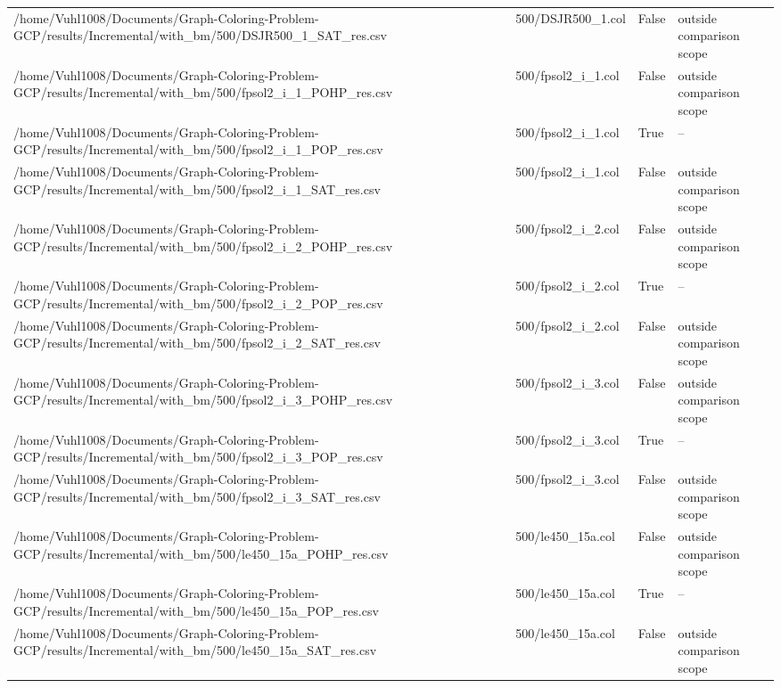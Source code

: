 \begin{table}[htbp]
\begin{tabular}{llll}
/home/Vuhl1008/Documents/Graph-Coloring-Problem-GCP/results/Incremental/with\_bm/500/DSJR500\_1\_SAT\_res.csv & 500/DSJR500\_1.col & False & outside comparison scope \\
/home/Vuhl1008/Documents/Graph-Coloring-Problem-GCP/results/Incremental/with\_bm/500/fpsol2\_i\_1\_POHP\_res.csv & 500/fpsol2\_i\_1.col & False & outside comparison scope \\
/home/Vuhl1008/Documents/Graph-Coloring-Problem-GCP/results/Incremental/with\_bm/500/fpsol2\_i\_1\_POP\_res.csv & 500/fpsol2\_i\_1.col & True & -- \\
/home/Vuhl1008/Documents/Graph-Coloring-Problem-GCP/results/Incremental/with\_bm/500/fpsol2\_i\_1\_SAT\_res.csv & 500/fpsol2\_i\_1.col & False & outside comparison scope \\
/home/Vuhl1008/Documents/Graph-Coloring-Problem-GCP/results/Incremental/with\_bm/500/fpsol2\_i\_2\_POHP\_res.csv & 500/fpsol2\_i\_2.col & False & outside comparison scope \\
/home/Vuhl1008/Documents/Graph-Coloring-Problem-GCP/results/Incremental/with\_bm/500/fpsol2\_i\_2\_POP\_res.csv & 500/fpsol2\_i\_2.col & True & -- \\
/home/Vuhl1008/Documents/Graph-Coloring-Problem-GCP/results/Incremental/with\_bm/500/fpsol2\_i\_2\_SAT\_res.csv & 500/fpsol2\_i\_2.col & False & outside comparison scope \\
/home/Vuhl1008/Documents/Graph-Coloring-Problem-GCP/results/Incremental/with\_bm/500/fpsol2\_i\_3\_POHP\_res.csv & 500/fpsol2\_i\_3.col & False & outside comparison scope \\
/home/Vuhl1008/Documents/Graph-Coloring-Problem-GCP/results/Incremental/with\_bm/500/fpsol2\_i\_3\_POP\_res.csv & 500/fpsol2\_i\_3.col & True & -- \\
/home/Vuhl1008/Documents/Graph-Coloring-Problem-GCP/results/Incremental/with\_bm/500/fpsol2\_i\_3\_SAT\_res.csv & 500/fpsol2\_i\_3.col & False & outside comparison scope \\
/home/Vuhl1008/Documents/Graph-Coloring-Problem-GCP/results/Incremental/with\_bm/500/le450\_15a\_POHP\_res.csv & 500/le450\_15a.col & False & outside comparison scope \\
/home/Vuhl1008/Documents/Graph-Coloring-Problem-GCP/results/Incremental/with\_bm/500/le450\_15a\_POP\_res.csv & 500/le450\_15a.col & True & -- \\
/home/Vuhl1008/Documents/Graph-Coloring-Problem-GCP/results/Incremental/with\_bm/500/le450\_15a\_SAT\_res.csv & 500/le450\_15a.col & False & outside comparison scope \\

\end{tabular}
\end{table}
